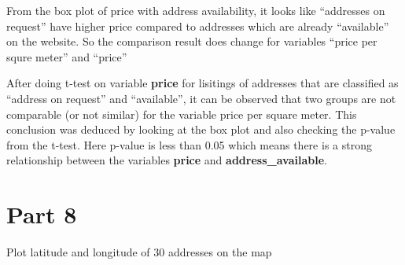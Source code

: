 \documentclass[
]{article}
\begin{document}
From the box plot of price with address availability, it looks like
``addresses on request'' have higher price compared to addresses which
are already ``available'' on the website. So the comparison result does
change for variables ``price per squre meter'' and ``price''

After doing t-test on variable \textbf{price} for lisitings of addresses
that are classified as ``address on request'' and ``available'', it can
be observed that two groups are not comparable (or not similar) for the
variable price per square meter. This conclusion was deduced by looking
at the box plot and also checking the p-value from the t-test. Here
p-value is less than 0.05 which means there is a strong relationship
between the variables \textbf{price} and \textbf{address\_available}.

\hypertarget{part-8}{%
\section{Part 8}\label{part-8}}

Plot latitude and longitude of 30 addresses on the map
\end{document}
